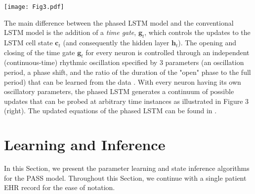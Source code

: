 \documentclass[twoside,11pt]{article}
\begin{document}
\begin{figure*}[t]
  \centering
  \texttt{[image: Fig3.pdf]}
	\label{Fig3}
\end{figure*}

The main difference between the phased LSTM model and the conventional LSTM model is the addition of a {\it time gate}, \mbox{\footnotesize $\boldsymbol{g}_t$}, which controls the updates to the LSTM cell state \mbox{\footnotesize $\boldsymbol{c}_t$} (and consequently the hidden layer \mbox{\footnotesize $\boldsymbol{h}_t$}). The opening and closing of the time gate \mbox{\footnotesize $\boldsymbol{g}_t$} for every neuron is controlled through an independent (continuous-time) rhythmic oscillation specified by 3 parameters (an oscillation period, a phase shift, and the ratio of the duration of the "open" phase to the full period) that can be learned from the data \cite{neil2016phased}. With every neuron having its own oscillatory parameters, the phased LSTM generates a continuum of possible updates that can be probed at arbitrary time instances as illustrated in Figure 3 (right). The updated equations of the phased LSTM can be found in \cite{neil2016phased}.   

\section{Learning and Inference}
\label{Sec4}
In this Section, we present the parameter learning and state inference algorithms for the PASS model. Throughout this Section, we continue with a single patient EHR record for the ease of notation.
\end{document}
